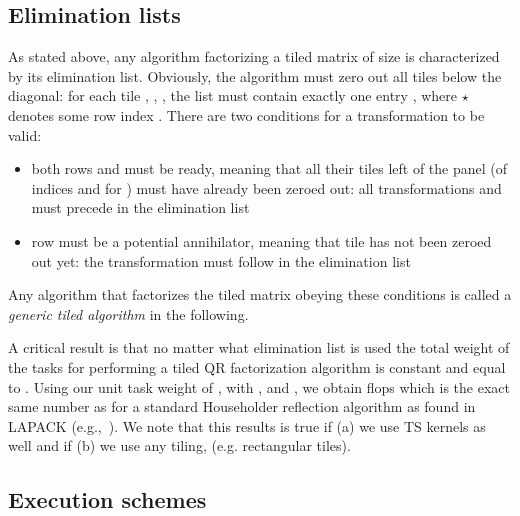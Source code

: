 \documentclass[a4paper,twopages]{article}
\newcommand{\s}{\ensuremath{\star}\xspace}
\begin{document}
\subsection{Elimination lists}

As stated above, any algorithm factorizing a tiled matrix
of size  is characterized by its elimination list.
Obviously, the algorithm must zero out all tiles below the diagonal: for each tile , ,
, the list must contain exactly one entry , where \s denotes some
row index  . There are two conditions for a transformation  to be valid:
\begin{itemize}
  \item both rows  and  must be ready, meaning that all their tiles
      left of the panel (of indices  and  for )
      must have already been zeroed out: all transformations 
       and  must precede
       in the elimination list
  \item row  must be a potential annihilator, meaning that tile
       has not been zeroed out yet: \newline the transformation
       must follow \linebreak  in the elimination list
\end{itemize}
Any algorithm that factorizes the tiled
matrix obeying these conditions is called a \emph{generic tiled algorithm} in
the following.

A critical result is that no matter what elimination list is used the total
weight of the tasks for performing a tiled QR factorization algorithm is
constant and equal to . Using our unit task weight of ,
with , and , we obtain  flops which is the
exact same number as for a standard Householder reflection algorithm as found
in LAPACK (e.g.,~\cite{lawn41}).
We note that this results is true if (a) we use TS kernels as well
and if (b) we use any tiling, (e.g. rectangular tiles).


\subsection{Execution schemes}
\end{document}
